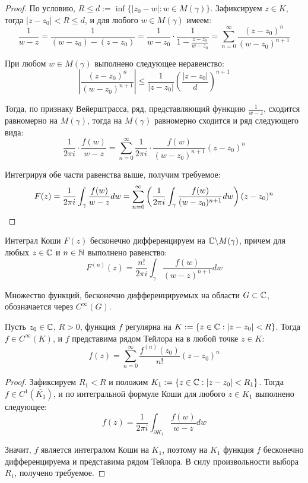 \begin{proof}
	По условию, $R \le d := \inf\{|z_0 - w| : w \in M(\gamma)\}$. Зафиксируем $z \in K$, тогда $|z - z_0| < R \le d$, и для любого $w \in M(\gamma)$ имеем:
	\[\frac1{w - z} = \frac1{(w-z_0) - (z - z_0)} = \frac1{w-z_0}\cdot \frac1{1 - \frac{z-z_0}{w - z_0}} = \sum_{n=0}^\infty\frac{(z-z_0)^n}{(w-z_0)^{n + 1}}\]
	
	При любом $w \in M(\gamma)$ выполнено следующее неравенство:
	\[\left|\frac{(z-z_0)^n}{(w-z_0)^{n + 1}}\right| \le \frac{1}{|z - z_0|}\left(\frac{|z - z_0|}{d}\right)^{n+1}\]
	
	Тогда, по признаку Вейерштрасса, ряд, представляющий функцию $\frac1{w - z}$, сходится равномерно на $M(\gamma)$, тогда на $M(\gamma)$ равномерно сходится и ряд следующего вида:
	\[\frac1{2\pi i} \cdot\frac{f(w)}{w-z} = \sum_{n=0}^\infty\frac1{2\pi i}\cdot \frac{f(w)}{(w-z_0)^{n + 1}}(z-z_0)^n\]
	
	Интегрируя обе части равенства выше, получим требуемое:
	\[F(z) = \frac1{2\pi i} \int_\gamma \frac{f(w)}{w-z}dw = \sum_{n=0}^\infty\left(\frac1{2\pi i} \int_\gamma\frac{f(w)}{(w-z_0)^{n + 1}}dw\right)(z-z_0)^n \qedhere\]
\end{proof}

\begin{corollary}
	Интеграл Коши $F(z)$ бесконечно дифференцируем на $\mathbb{C} \backslash M(\gamma)$, причем для любых $z \in \mathbb{C}$ и $n \in \mathbb{N}$ выполнено равенство:
	\[F^{(n)}(z) = \frac{n!}{2\pi i} \int_\gamma\frac{f(w)}{(w-z)^{n + 1}}dw\]
\end{corollary}

\begin{definition}
	Множество функций, бесконечно дифференцируемых на области $G \subset \mathbb{C}$, обозначается через $C^\infty(G)$.
\end{definition}

\begin{theorem}
	Пусть $z_0 \in \mathbb{C}$, $R > 0$, функция $f$ регулярна на $K := \{z \in \mathbb{C} : |z - z_0| < R\}$. Тогда $f \in C^\infty(K)$, и $f$ представима рядом Тейлора на в любой точке $z \in K$:
	\[f(z) = \sum_{n = 0}^\infty \frac{f^{(n)}(z_0)}{n!}(z - z_0)^n\]
\end{theorem}

\begin{proof}
	Зафиксируем $R_1 < R$ и положим $K_1 := \{z \in \mathbb{C}: |z - z_0| < R_1\}$. Тогда $f \in C^1(\overline{K_1})$, и по интегральной формуле Коши для любого $z \in K_1$ выполнено следующее:
	\[f(z) = \frac{1}{2\pi i}\int_{\partial K_1}\frac{f(w)}{w - z}dw\]
	
	Значит, $f$ является интегралом Коши на $K_1$, поэтому на $K_1$ функция $f$ бесконечно дифференцируема и представима рядом Тейлора. В силу произвольности выбора $R_1$, получено требуемое.
\end{proof}

